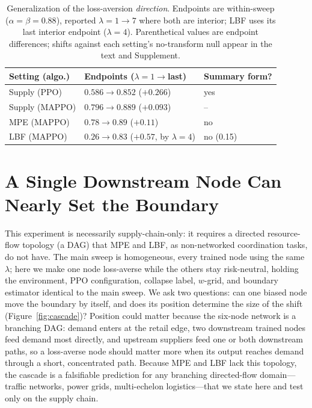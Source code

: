 \documentclass[letterpaper]{article} %
\theoremstyle{plain}
\begin{document}
\begin{table}[t]
\centering
\caption{Generalization of the loss-aversion \emph{direction}. Endpoints are within-sweep
($\alpha{=}\beta{=}0.88$), reported $\lambda{=}1\to7$ where both are interior; LBF uses its last
interior endpoint ($\lambda{=}4$). Parenthetical values are endpoint differences; shifts against
each setting's no-transform null appear in the text and Supplement.}
\label{tab:generalization}
\scriptsize
\begin{tabular}{p{}p{}p{}}
\toprule
Setting (algo.) & Endpoints ($\lambda{=}1\to$last) & Summary form? \\
\midrule
Supply (PPO)  & $0.586\!\to\!0.852$ ($+0.266$) & yes \\
Supply (MAPPO) & $0.796\!\to\!0.889$ ($+0.093$) & -- \\
MPE (MAPPO) & $0.78\!\to\!0.89$ ($+0.11$) & no \\
LBF (MAPPO) & $0.26\!\to\!0.83$ ($+0.57$, by $\lambda{=}4$) & no (0.15) \\
\bottomrule
\end{tabular}
\end{table}

\section{A Single Downstream Node Can Nearly Set the Boundary}
\label{sec:minority}

This experiment is necessarily supply-chain-only: it requires a directed resource-flow topology
(a DAG) that MPE and LBF, as non-networked coordination tasks, do not have. The main sweep is
homogeneous, every trained node using the same $\lambda$; here we make one node loss-averse while
the others stay risk-neutral, holding the environment, PPO configuration, collapse label, $w$-grid,
and boundary estimator identical to the main sweep. We ask two questions: can one biased node move
the boundary by itself, and does its position determine the size of the shift
(Figure~\ref{fig:cascade})? Position could matter because the six-node network is a branching DAG:
demand enters at the retail edge, two downstream trained nodes feed demand most directly, and
upstream suppliers feed one or both downstream paths, so a loss-averse node should matter more when
its output reaches demand through a short, concentrated path. Because MPE and LBF lack this topology,
the cascade is a falsifiable prediction for any branching directed-flow domain---traffic networks,
power grids, multi-echelon logistics---that we state here and test only on the supply chain.
\end{document}
